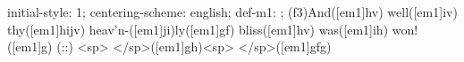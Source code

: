 initial-style: 1;
centering-scheme: english;
def-m1: \grealign;
(f3)And([em1]hv) well([em1]iv) thy([em1]hijv) heav'n-([em1]ji)ly([em1]gf) bliss([em1]hv) was([em1]ih) won!([em1]g) (::) <sp> </sp>([em1]gh)<sp>   </sp>([em1]gfg)
